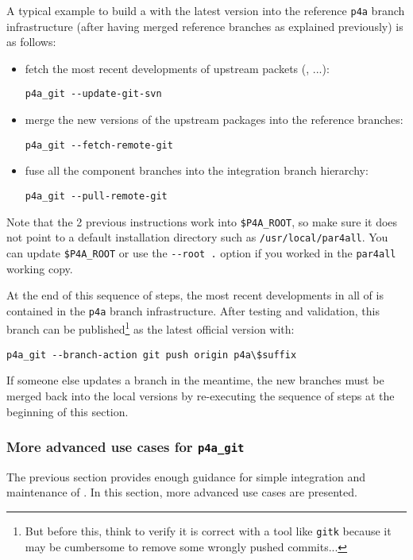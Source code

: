 \documentclass[a4paper]{article}
\begin{document}
A typical example to build a \Apfa with the latest \Apips version into the
reference \verb|p4a| branch infrastructure (after having merged
reference branches as explained previously) is as follows:
\begin{itemize}
\item fetch the most recent developments of upstream packets (\Apips,
  \Apolylib...):
\begin{verbatim}
p4a_git --update-git-svn
\end{verbatim}
\item merge the new versions of the upstream packages into the \Apfa
  reference branches:
\begin{verbatim}
p4a_git --fetch-remote-git
\end{verbatim}
\item fuse all the component branches into the \Apfa integration
  branch hierarchy:
\begin{verbatim}
p4a_git --pull-remote-git
\end{verbatim}
\end{itemize}
Note that the 2 previous instructions work into \verb|$P4A_ROOT|, %
so make sure it does not point to a default installation directory such as
\texttt{/usr/local/par4all}. You can update \verb|$P4A_ROOT| %
or use the \verb|--root .| option if you worked in the \texttt{par4all}
working copy.

At the end of this sequence of steps, the most recent developments in all
of \Apfa is contained in the \verb|p4a| branch infrastructure.  After
testing and validation, this branch can be published\footnote{But before
  this, think to verify it is correct with a tool like \texttt{gitk}
  because it may be cumbersome to remove some wrongly pushed commits...}
as the latest official version with:
\begin{verbatim}
p4a_git --branch-action git push origin p4a\$suffix
\end{verbatim}
If someone else updates a branch in the meantime, the new branches
must be merged back into the local versions by re-executing the sequence
of steps at the beginning of this section.

\subsubsection{More advanced use cases for \protect\texttt{p4a\_git}}
\label{sec:more-advanced-use}

The previous section provides enough guidance for simple integration
and maintenance of \Apfa. In this section, more advanced use cases are
presented.
\end{document}
